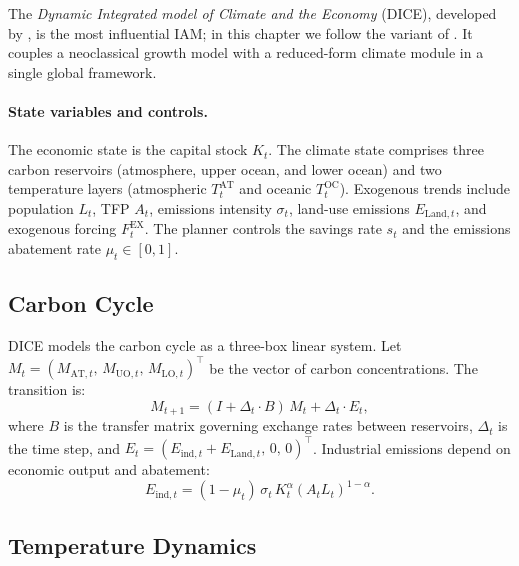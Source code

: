 \documentclass[11pt,a4paper]{report}
\begin{document}
The \emph{Dynamic Integrated model of Climate and the Economy} (DICE), developed by \citet{nordhaus1994managing}, is the most influential IAM; in this chapter we follow the variant of \citet{nordhausRevisitingSocialCost2017}.  It couples a neoclassical growth model with a reduced-form climate module in a single global framework.

\paragraph{State variables and controls.}
The economic state is the capital stock $K_t$.  The climate state comprises three carbon reservoirs (atmosphere, upper ocean, and lower ocean) and two temperature layers (atmospheric $T^{\mathrm{AT}}_t$ and oceanic $T^{\mathrm{OC}}_t$).  Exogenous trends include population $L_t$, TFP $A_t$, emissions intensity $\sigma_t$, land-use emissions $E_{\mathrm{Land},t}$, and exogenous forcing $F^{\mathrm{EX}}_t$.  The planner controls the savings rate $s_t$ and the emissions abatement rate $\mu_t \in [0,1]$.

\subsection{Carbon Cycle}

DICE models the carbon cycle as a three-box linear system.  Let $M_t = (M_{\mathrm{AT},t},\, M_{\mathrm{UO},t},\, M_{\mathrm{LO},t})^\top$ be the vector of carbon concentrations.  The transition is:
\begin{equation}
M_{t+1} = (I + \Delta_t \cdot B)\, M_t + \Delta_t \cdot E_t,
\label{eq:carbon_cycle}
\end{equation}
where $B$ is the transfer matrix governing exchange rates between reservoirs, $\Delta_t$ is the time step, and $E_t = (E_{\mathrm{ind},t} + E_{\mathrm{Land},t},\, 0,\, 0)^\top$.  Industrial emissions depend on economic output and abatement:
\begin{equation}
E_{\mathrm{ind},t} = (1 - \mu_t)\,\sigma_t\, K_t^\alpha (A_t L_t)^{1-\alpha}.
\end{equation}

\subsection{Temperature Dynamics}
\end{document}
